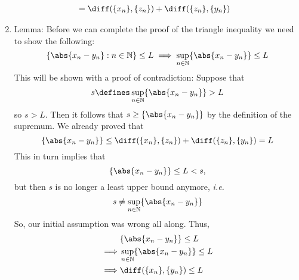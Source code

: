 \begin{exm}
\begin{flushleft}
\begin{enumerate}
\begin{align*}
				                    & = \diff(\{x_n\},\{z_n\}) + \diff(\{z_n\},\{y_n\})
			      \end{align*}
			\item Lemma: Before we can complete the proof of the triangle inequality
			      we need to show the following:
			      \begin{equation*}
				      \{\abs{x_n-y_n}:n\in\mathbb{N}\}\leq L \implies \sup_{n\in\mathbb{N}} \{\abs{x_n-y_n}\}\leq L
			      \end{equation*}
			      This will be shown with a proof of contradiction: Suppose that
			      \begin{equation*}
				      s\defines \sup_{n\in\mathbb{N}} \{\abs{x_n-y_n}\}> L
			      \end{equation*}
			      so $s > L$. Then it follows that $s \geq \{\abs{x_n-y_n}\}$ by the definition
			      of the supremum. We already proved that
			      \begin{equation*}
				      \{\abs{x_n-y_n}\} \leq \diff(\{x_n\},\{z_n\}) + \diff(\{z_n\},\{y_n\}) = L
			      \end{equation*}
			      This in turn implies that
			      \begin{equation*}
				      \{\abs{x_n-y_n}\} \leq L < s,
			      \end{equation*}
			      but then $s$ is no longer a least upper bound anymore, \textit{i.e.}
			      \begin{equation*}
				      s \neq \sup_{n\in\mathbb{N}} \{\abs{x_n-y_n}\}
			      \end{equation*}
			      So, our initial assumption was wrong all along. Thus,
			      \begin{align*}
				       & \{\abs{x_n-y_n}\} \leq L                       \\
				      \implies
				       & \sup_{n\in\mathbb{N}} \{\abs{x_n-y_n}\} \leq L \\
				      \implies
				       & \diff(\{x_n\},\{y_n\}) \leq L
			      \end{align*}
		\end{enumerate}
	\end{flushleft}
\end{exm}

